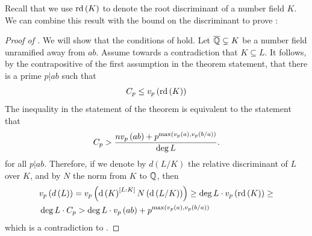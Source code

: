 \documentclass[../main.tex]{subfiles}
\begin{document}
  Recall that we use $\operatorname{\rm rd}\left( K \right)$ to denote the root discriminant of a number field $K$.
  We can combine this result with the bound on the discriminant to prove :
  \begin{proof}[Proof of ]
    We will show that the conditions of  hold.
    Let $\overline{\mathbb{Q}} \subsetneq K$ be a number field unramified away from $ab$.
    Assume towards a contradiction that $K \subseteq L$.
    It follows, by the contrapositive of the first assumption in the theorem statement, that there is a prime $p|ab$ such that 
    \[
      C_p \leq v_p\left( \operatorname{\rm rd}\left( K \right) \right) 
    \] 
    The inequality in the statement of the theorem is equivalent to
    the statement that
    \[
      C_p > \frac{n v_p\left( ab \right) + p^{\max\left( v_p\left( a \right), v_p\left( b / a \right) \right)}}{\deg L}
      .
    \]
    for all $p|ab$.
    Therefore, if we denote by $d\left( L/K \right)$ the relative discriminant of $L$ over $K$, and by $N$ the norm from $K$ to $\mathbb{Q}$, then
    \begin{align*}
      & v_p\left( d\left( L \right) \right) = 
      v_p\left( \operatorname{\rm d}\left( K \right)^{\left[ L:K \right]} N\left( \operatorname{\rm d}\left( L/K \right) \right) \right) \geq \deg L \cdot v_p\left( \operatorname{\rm rd}\left( K \right) \right) \geq \\
      & \deg L \cdot C_p > 
      \deg L \cdot v_p\left( ab \right) + p^{\max\left( v_p\left( a \right), v_p\left( b / a \right) \right)}
    \end{align*}
    which is a contradiction to .
  \end{proof}
\end{document}
